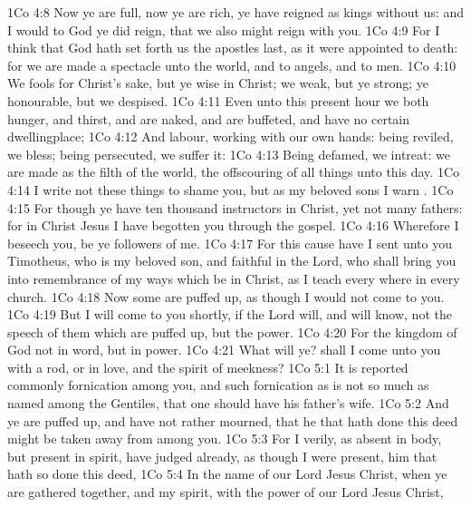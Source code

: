 \vs 1Co 4:8 Now ye are full, now ye are rich, ye have reigned as kings without us: and I would to God ye did reign, that we also might reign with you.
\vs 1Co 4:9 For I think that God hath set forth us the apostles last, as it were appointed to death: for we are made a spectacle unto the world, and to angels, and to men.
\vs 1Co 4:10 We  fools for Christ's sake, but ye  wise in Christ; we  weak, but ye  strong; ye  honourable, but we  despised.
\vs 1Co 4:11 Even unto this present hour we both hunger, and thirst, and are naked, and are buffeted, and have no certain dwellingplace;
\vs 1Co 4:12 And labour, working with our own hands: being reviled, we bless; being persecuted, we suffer it:
\vs 1Co 4:13 Being defamed, we intreat: we are made as the filth of the world,  the offscouring of all things unto this day.
\vs 1Co 4:14 I write not these things to shame you, but as my beloved sons I warn .
\vs 1Co 4:15 For though ye have ten thousand instructors in Christ, yet  not many fathers: for in Christ Jesus I have begotten you through the gospel.
\vs 1Co 4:16 Wherefore I beseech you, be ye followers of me.
\vs 1Co 4:17 For this cause have I sent unto you Timotheus, who is my beloved son, and faithful in the Lord, who shall bring you into remembrance of my ways which be in Christ, as I teach every where in every church.
\vs 1Co 4:18 Now some are puffed up, as though I would not come to you.
\vs 1Co 4:19 But I will come to you shortly, if the Lord will, and will know, not the speech of them which are puffed up, but the power.
\vs 1Co 4:20 For the kingdom of God  not in word, but in power.
\vs 1Co 4:21 What will ye? shall I come unto you with a rod, or in love, and  the spirit of meekness?
\vs 1Co 5:1 It is reported commonly  fornication among you, and such fornication as is not so much as named among the Gentiles, that one should have his father's wife.
\vs 1Co 5:2 And ye are puffed up, and have not rather mourned, that he that hath done this deed might be taken away from among you.
\vs 1Co 5:3 For I verily, as absent in body, but present in spirit, have judged already, as though I were present,  him that hath so done this deed,
\vs 1Co 5:4 In the name of our Lord Jesus Christ, when ye are gathered together, and my spirit, with the power of our Lord Jesus Christ,

